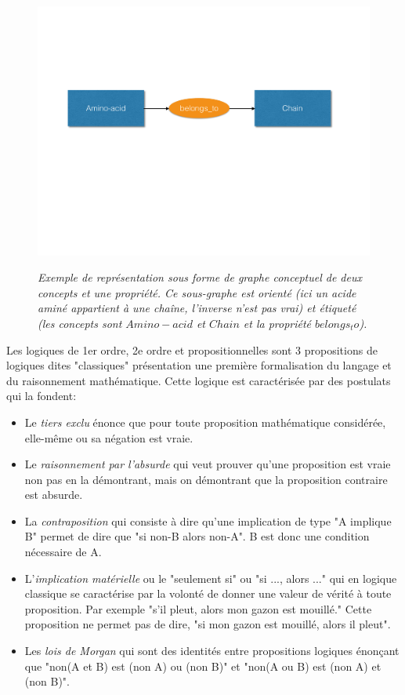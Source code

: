 \begin{figure}
  \centering
  {\includegraphics[width=.6\linewidth]{./figures/ch2/conceptual_graph}}
    \caption{\it Exemple de représentation sous forme de graphe conceptuel de deux concepts et une propriété. Ce sous-graphe est orienté (ici un acide aminé appartient à une chaîne, l'inverse n'est pas vrai) et étiqueté (les concepts sont $Amino-acid$ et $Chain$ et la propriété $belongs_to$).}
  \label{Fig:conceptual_graph}
  \hspace{0.5cm}
\end{figure}


Les logiques de 1er ordre, 2e ordre et propositionnelles sont 3 propositions de logiques dites "classiques" présentation une première formalisation du langage et du raisonnement mathématique. Cette logique est caractérisée par des postulats qui la fondent:

\begin{itemize}
  \item Le \textit{tiers exclu} énonce que pour toute proposition mathématique considérée, elle-même ou sa négation est vraie.
  \item Le \textit{raisonnement par l'absurde} qui veut prouver qu'une proposition est vraie non pas en la démontrant, mais on démontrant que la proposition contraire est absurde.
  \item La \textit{contraposition} qui consiste à dire qu'une implication de type "A implique B" permet de dire que "si non-B alors non-A". B est donc une condition nécessaire de A.
  \item L'\textit{implication matérielle} ou le "seulement si" ou "si ..., alors ..." qui en logique classique se caractérise par la volonté de donner une valeur de vérité à toute proposition. Par exemple "s'il pleut, alors mon gazon est mouillé." Cette proposition ne permet pas de dire, "si mon gazon est mouillé, alors il pleut".
  \item Les \textit{lois de Morgan} qui sont des identités entre propositions logiques énonçant que "non(A et B) est (non A) ou (non B)" et "non(A ou B) est (non A) et (non B)".
\end{itemize}

